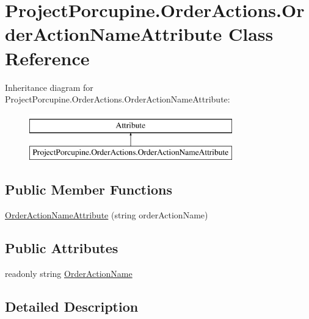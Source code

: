 \hypertarget{class_project_porcupine_1_1_order_actions_1_1_order_action_name_attribute}{}\section{Project\+Porcupine.\+Order\+Actions.\+Order\+Action\+Name\+Attribute Class Reference}
\label{class_project_porcupine_1_1_order_actions_1_1_order_action_name_attribute}
Inheritance diagram for Project\+Porcupine.\+Order\+Actions.\+Order\+Action\+Name\+Attribute\+:\begin{figure}[H]
\begin{center}
\leavevmode
\includegraphics[height=2.000000cm]{class_project_porcupine_1_1_order_actions_1_1_order_action_name_attribute}
\end{center}
\end{figure}
\subsection*{Public Member Functions}
\begin{DoxyCompactItemize}
\item 
\hyperlink{class_project_porcupine_1_1_order_actions_1_1_order_action_name_attribute_ad33be2a529edf8f0b7c765680a80df3b}{Order\+Action\+Name\+Attribute} (string order\+Action\+Name)
\end{DoxyCompactItemize}
\subsection*{Public Attributes}
\begin{DoxyCompactItemize}
\item 
readonly string \hyperlink{class_project_porcupine_1_1_order_actions_1_1_order_action_name_attribute_a1d1480dc377252ec39fcd5777c59ed3c}{Order\+Action\+Name}
\end{DoxyCompactItemize}


\subsection{Detailed Description}


